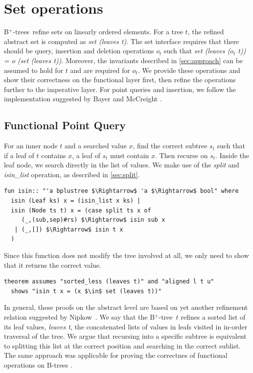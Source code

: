 \documentclass[runningheads]{llncs}
\newcommand{\btree}{B$^+$-tree}
\newcommand{\btrees}{B$^+$-trees}
\begin{document}
\section{Set operations}
\label{sec:set}

\btrees\ refine sets on linearly ordered elements.
For a tree $t$, the refined abstract set is computed as \emph{set (leaves t)}.
The set interface requires that there should be query, insertion and deletion
operations $o_t$ such that \emph{set (leaves ($o_t$ t)) = o (set (leaves t))}.
Moreover, the invariants described in \cref{sec:approach}
can be assumed to hold for $t$ and are required for $o_t$.
We provide these operations and show their correctness on the functional
layer first, then refine the operations further to the imperative
layer.
For point queries and insertion, we follow the implementation
suggested by Bayer and McCreight \cite{DBLP:journals/acta/BayerM72}.

\subsection{Functional Point Query}
\label{sec:functional_pq}

For an inner node $t$ and a searched value $x$, find the correct subtree $s_t$
such that if a leaf of $t$ contains $x$, a leaf of $s_t$ must contain $x$.
Then recurse on $s_t$.
Inside the leaf node, we search directly in the list of values.
We make use of the \textit{split} and \textit{isin\_list} operation,
as described in \cref{sec:split}.

\begin{lstlisting}[mathescape=true, language=Isabelle,label=lst:isin-def]
fun isin:: "'a bplustree $\Rightarrow$ 'a $\Rightarrow$ bool" where
  isin (Leaf ks) x = (isin_list x ks) |
  isin (Node ts t) x = (case split ts x of
     (_,(sub,sep)#rs) $\Rightarrow$ isin sub x
   | (_,[]) $\Rightarrow$ isin t x
  )
\end{lstlisting}

Since this function does not modify the tree involved at all,
we only need to show that it returns the correct value.

\begin{lstlisting}[mathescape=true, language=Isabelle,label=lst:isin-set-inorder]
theorem assumes "sorted_less (leaves t)" and "aligned l t u" 
  shows "isin t x = (x $\in$ set (leaves t))"
\end{lstlisting}

In general, these proofs on the abstract level are 
based on yet another refinement relation suggested by Nipkow~\cite{DBLP:conf/itp/Nipkow16}. 
We say that the \btree\ $t$ refines a sorted list of its leaf values, \emph{leaves t},
the concatenated lists of values in leafs visited in in-order traversal of the tree.
We argue that recursing into a specific subtree
is equivalent to splitting this list at the correct position
and searching in the correct sublist.
The same approach was applicable for proving the correctnes of functional
operations on B-trees \cite{DBLP:journals/afp/Mundler21}.
\end{document}
